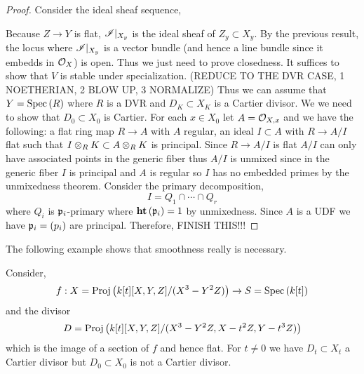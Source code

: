 \documentclass[12pt]{article}
\begin{document}
\begin{proof}
Consider the ideal sheaf sequence,
\begin{center}
\end{center}
Because $Z \to Y$ is flat, $\mathscr{I}|_{X_y}$ is the ideal sheaf of $Z_y \subset X_y$. By the previous result, the locus where $\mathscr{I}|_{X_y}$ is a vector bundle (and hence a line bundle since it embedds in $\mathcal{O}_{X}$) is open. Thus we just need to prove closedness. It suffices to show that $V$ is stable under specialization. 
(REDUCE TO THE DVR CASE, 1 NOETHERIAN, 2 BLOW UP, 3 NORMALIZE)
Thus we can assume that $Y = \mathrm{Spec}\left( R \right)$ where $R$ is a DVR and $D_K \subset X_K$ is a Cartier divisor. We we need to show that $D_0 \subset X_0$ is Cartier. For each $x \in X_0$ let $A = \mathcal{O}_{X, x}$ and we have the following: a flat ring map $R \to A$ with $A$ regular, an ideal $I \subset A$ with $R \to A/I$ flat such that $I \otimes_R K \subset A \otimes_R K$ is principal. Since $R \to A/I$ is flat $A/I$ can only have associated  points in the generic fiber thus $A/I$ is unmixed since in the generic fiber $I$ is principal and $A$ is regular so $I$ has no embedded primes by the unmixedness theorem. Consider the primary decomposition, 
\[ I = Q_1 \cap \cdots \cap Q_r \]
where $Q_i$ is $\mathfrak{p}_i$-primary where $\mathbf{ht}\left( \mathfrak{p}_i \right) = 1$ by unmixedness. Since $A$ is a UDF we have $\mathfrak{p}_i = (p_i)$ are principal. Therefore, FINISH THIS!!!
\end{proof}

\begin{rmk}
The following example shows that smoothness really is necessary. 
\end{rmk}

\begin{example}
Consider,
\[ f : X = \mathrm{Proj}\left( k[t][X,Y,Z]/(X^3-Y^2Z) \right) \to S = \mathrm{Spec}\left( k[t] \right) \]
and the divisor
\[ D = \mathrm{Proj}\left( k[t][X,Y,Z]/(X^3 - Y^2 Z, X - t^2 Z, Y - t^3 Z) \right) \]
which is the image of a section of $f$ and hence flat. For $t \neq 0$ we have $D_t \subset X_t$ a Cartier divisor but $D_0 \subset X_0$ is not a Cartier divisor. 
\end{example}
\end{document}
